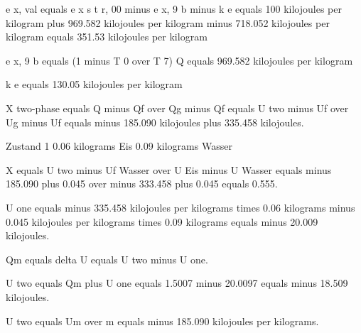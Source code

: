 e x, val equals e x s t r, 00 minus e x, 9 b minus k e equals 100 kilojoules per kilogram plus 969.582 kilojoules per kilogram minus 718.052 kilojoules per kilogram equals 351.53 kilojoules per kilogram

e x, 9 b equals (1 minus T 0 over T 7) Q equals 969.582 kilojoules per kilogram

k e equals 130.05 kilojoules per kilogram

X two-phase equals Q minus Qf over Qg minus Qf equals U two minus Uf over Ug minus Uf equals minus 185.090 kilojoules plus 335.458 kilojoules.

Zustand 1
0.06 kilograms Eis
0.09 kilograms Wasser

X equals U two minus Uf Wasser over U Eis minus U Wasser equals minus 185.090 plus 0.045 over minus 333.458 plus 0.045 equals 0.555.

U one equals minus 335.458 kilojoules per kilograms times 0.06 kilograms minus 0.045 kilojoules per kilograms times 0.09 kilograms equals minus 20.009 kilojoules.

Qm equals delta U equals U two minus U one.

U two equals Qm plus U one equals 1.5007 minus 20.0097 equals minus 18.509 kilojoules.

U two equals Um over m equals minus 185.090 kilojoules per kilograms.